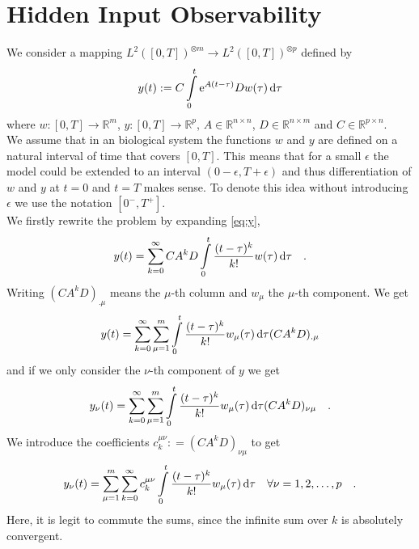 \section{Hidden Input Observability}

We consider a mapping $L^2([0,T])^{\otimes m}\to L^2([0,T])^{\otimes p}$ defined by 
\begin{equation}
y(t) := C \int\limits_0^t \text{e}^{A(t-\tau)} D w(\tau) \, \text{d} \tau \label{eq:y}
\end{equation}
where $w:[0,T]\to \mathbb{R}^m$, $y:[0,T]\to \mathbb{R}^p$, $A\in\mathbb{R}^{n\times n}$, 
$D\in\mathbb{R}^{n\times m}$ and $C\in\mathbb{R}^{p\times n}$. \\

We assume that in an biological system the functions $w$ and $y$ are defined on 
a natural interval of time that covers $[0,T]$. This means that for a small $\epsilon$ the 
model could be extended to an interval $(0-\epsilon , T+\epsilon)$ and thus differentiation 
of $w$ and $y$ at $t=0$ and $t=T$ makes sense. To denote this idea without 
introducing $\epsilon$ we use the notation $[0^-,T^+]$.
\\

We firstly rewrite the problem by expanding \eqref{eq:y}, 
\begin{equation}
y(t) = \sum\limits_{k=0}^\infty CA^kD \int\limits_0^t \frac{(t-\tau)^k}{k!} w(\tau) \, \text{d} 
\tau \quad .
\end{equation}
Writing $(CA^kD)_{.\mu}$ means the $\mu$-th column and $w_\mu$ the $\mu$-th component. We 
get 
\begin{equation}
y(t) = \sum\limits_{k=0}^\infty \sum\limits_{\mu=1}^m \int\limits_0^t \frac{(t-\tau)^k}{k!}
w_\mu(\tau) \, \text{d} \tau (CA^kD)_{.\mu} 
\end{equation} 
and if we only consider the $\nu$-th component of $y$ we get 
\begin{equation}
y_\nu(t) = \sum\limits_{k=0}^\infty \sum\limits_{\mu=1}^m \int\limits_0^t 
\frac{(t-\tau)^k}{k!} w_\mu(\tau) \, \text{d} \tau (CA^kD)_{\nu\mu} \quad .
\end{equation}
We introduce the coefficients $c_k^{\mu\nu} : = (C A^k D)_{\nu\mu}$ to get
\begin{equation}
y_\nu(t) = \sum\limits_{\mu=1}^m \sum\limits_{k=0}^\infty  c_k^{\mu\nu}  \int\limits_0^t 
\frac{(t-\tau)^k}{k!} w_\mu(\tau) \,\text{d}\tau
\quad \forall \nu = 1,2,\ldots , p
 \quad . \label{eq:y_operator}
\end{equation}
Here, it is legit to commute the sums, since the infinite sum over $k$ is absolutely 
convergent.\\

